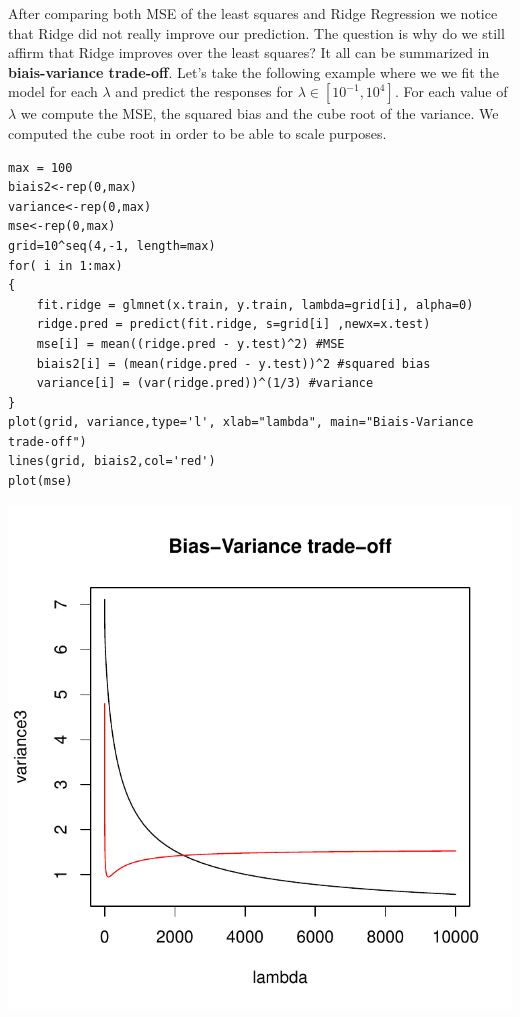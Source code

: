 \documentclass[]{report}
\begin{document}
After comparing both MSE of the least squares and Ridge Regression we notice that Ridge did not really improve our prediction. The question is why do we still affirm that Ridge improves over the least squares? It all can be summarized in\textbf{ biais-variance trade-off}. Let's take the following example where we we fit the model for each $\lambda$ and predict the responses for $\lambda\in[10^{-1},10^{4}]$. For each value of $\lambda$ we compute the MSE, the squared bias and the cube root of the variance. We computed the cube root in order to be able to scale purposes.
\begin{lstlisting}
max = 100
biais2<-rep(0,max)
variance<-rep(0,max) 
mse<-rep(0,max)
grid=10^seq(4,-1, length=max)
for( i in 1:max)
{     
	fit.ridge = glmnet(x.train, y.train, lambda=grid[i], alpha=0)
	ridge.pred = predict(fit.ridge, s=grid[i] ,newx=x.test)
	mse[i] = mean((ridge.pred - y.test)^2) #MSE
	biais2[i] = (mean(ridge.pred - y.test))^2 #squared bias
	variance[i] = (var(ridge.pred))^(1/3) #variance
}
plot(grid, variance,type='l', xlab="lambda", main="Biais-Variance trade-off")
lines(grid, biais2,col='red')
plot(mse)
\end{lstlisting}

\begin{center}
	\includegraphics[width=0.8\linewidth]{Figures/ridge_biais_var.pdf}
\end{center}
\end{document}
